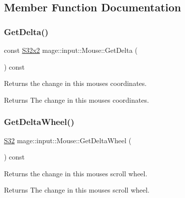 \subsection{Member Function Documentation}
\mbox{\label{classmage_1_1input_1_1_mouse_a6f789e976d80c6f9c92388e3cf3502d6}} 
\subsubsection{\texorpdfstring{Get\+Delta()}{GetDelta()}}
{\footnotesize\ttfamily const \mbox{\hyperlink{namespacemage_aad06aca0b442d3b41653eafed822d571}{S32x2}} mage\+::input\+::\+Mouse\+::\+Get\+Delta (\begin{DoxyParamCaption}{ }\end{DoxyParamCaption}) const\hspace{0.3cm}{\ttfamily [noexcept]}}

Returns the change in this mouse\textquotesingle{}s coordinates.

\begin{DoxyReturn}{Returns}
The change in this mouse\textquotesingle{}s coordinates. 
\end{DoxyReturn}
\mbox{\label{classmage_1_1input_1_1_mouse_a71d088496a46d2915eb3fb8ba7dbb8e5}} 
\subsubsection{\texorpdfstring{Get\+Delta\+Wheel()}{GetDeltaWheel()}}
{\footnotesize\ttfamily \mbox{\hyperlink{namespacemage_a2ef1a005a77358f1825d13fd481b557f}{S32}} mage\+::input\+::\+Mouse\+::\+Get\+Delta\+Wheel (\begin{DoxyParamCaption}{ }\end{DoxyParamCaption}) const\hspace{0.3cm}{\ttfamily [noexcept]}}

Returns the change in this mouse\textquotesingle{}s scroll wheel.

\begin{DoxyReturn}{Returns}
The change in this mouse\textquotesingle{}s scroll wheel. 
\end{DoxyReturn}
\mbox{\label{classmage_1_1input_1_1_mouse_ac15719c468a94885a256e34b27cf2ca5}} 

